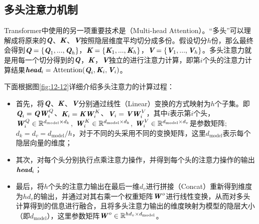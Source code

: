 
\subsection{多头注意力机制}

\parinterval Transformer中使用的另一项重要技术是{\small{}}（Multi-head Attention）。“多头”可以理解成将原来的$\textbf{\em Q}$、$\textbf{\em K}$、$\textbf{\em V}$按照隐层维度平均切分成多份。假设切分$h$份，那么最终会得到$\textbf{\em Q} = \{ \textbf{\em Q}_1,...,\textbf{\em Q}_h \}$，$\textbf{\em K}=\{ \textbf{\em K}_1,...,\textbf{\em K}_h \}$，$\textbf{\em V}=\{ \textbf{\em V}_1,...,\textbf{\em V}_h \}$。多头注意力就是用每一个切分得到的$\textbf{\em Q}$，$\textbf{\em K}$，$\textbf{\em V}$独立的进行注意力计算，即第$i$个头的注意力计算结果$\textbf{\em head}_i = \textrm{Attention}(\textbf{\em Q}_i,\textbf{\em K}_i, \textbf{\em V}_i)$。

\parinterval 下面根据图\ref{fig:12-12}详细介绍多头注意力的计算过程：

\begin{itemize}
\vspace{0.5em}
\item 首先，将$\textbf{\em Q}$、$\textbf{\em K}$、$\textbf{\em V}$分别通过线性（Linear）变换的方式映射为$h$个子集。即$\textbf{\em Q}_i = \textbf{\em Q}\textbf{\em W}_i^{\,Q} $、$\textbf{\em K}_i = \textbf{\em K}\textbf{\em W}_i^{\,K} $、$\textbf{\em V}_i = \textbf{\em V}\textbf{\em W}_i^{\,V} $，其中$i$表示第$i$个头， $\textbf{\em W}_i^{\,Q}  \in \mathbb{R}^{d_{\textrm{model}} \times d_k}$,  $\textbf{\em W}_i^{\,K}  \in \mathbb{R}^{d_{\textrm{model}} \times d_k}$,  $\textbf{\em W}_i^{\,V}  \in \mathbb{R}^{d_{\textrm{model}} \times d_v}$是参数矩阵; $d_k=d_v=d_{\textrm{model}} / h$，对于不同的头采用不同的变换矩阵，这里$d_{\textrm{model}}$表示每个隐层向量的维度；
\vspace{0.5em}
\item 其次，对每个头分别执行点乘注意力操作，并得到每个头的注意力操作的输出$\textbf{\em head}_i$；
\vspace{0.5em}
\item 最后，将$h$个头的注意力输出在最后一维$d_v$进行拼接（Concat）重新得到维度为$hd_v$的输出，并通过对其右乘一个权重矩阵$\textbf{\em W}^{\,o}$进行线性变换，从而对多头计算得到的信息进行融合，且将多头注意力输出的维度映射为模型的隐层大小（即$d_{\textrm{model}}$），这里参数矩阵$\textbf{\em W}^{\,o} \in \mathbb{R}^{h d_v \times d_{\textrm{model}}}$。
\vspace{0.5em}
\end{itemize}

